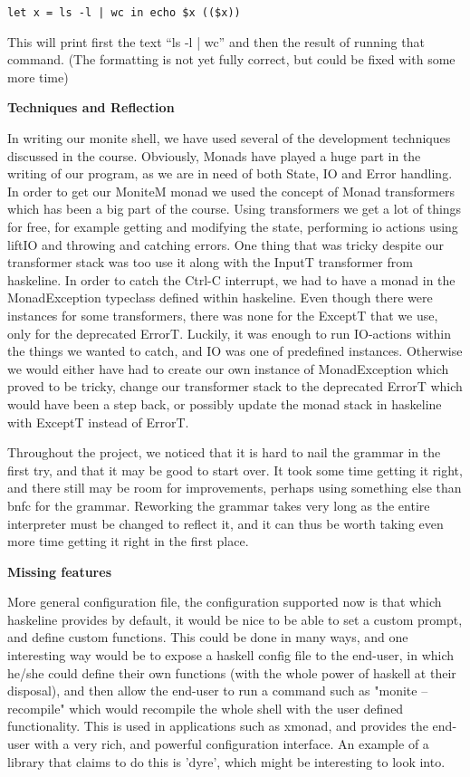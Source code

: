 \documentclass[11pt,a4paper]{article}
\begin{document}
\begin{verbatim}
let x = ls -l | wc in echo $x (($x))
\end{verbatim}

This will print first the text ``ls -l | wc'' and then the result of running
that command. (The formatting is not yet fully correct, but could be fixed with
some more time)

\textbf{Techniques and Reflection}

In writing our monite shell, we have used several of the development techniques
discussed in the course. Obviously, Monads have played a huge part in the
writing of our program, as we are in need of both State, IO and Error handling.
In order to get our MoniteM monad we used the concept of Monad transformers
which has been a big part of the course. Using transformers we get a lot of
things for free, for example getting and modifying the state, performing io
actions using liftIO and throwing and catching errors. One thing that was
tricky despite our transformer stack was too use it along with the InputT
transformer from haskeline. In order to catch the Ctrl-C interrupt, we had to
have a monad in the MonadException typeclass defined within haskeline. Even
though there were instances for some transformers, there was none for the
ExceptT that we use, only for the deprecated ErrorT. Luckily, it was enough to
run IO-actions within the things we wanted to catch, and IO was one of
predefined instances. Otherwise we would either have had to create our own
instance of MonadException which proved to be tricky, change our transformer
stack to the deprecated ErrorT which would have been a step back, or possibly
update the monad stack in haskeline with ExceptT instead of ErrorT.

Throughout the project, we noticed that it is hard to nail the grammar in the
first try, and that it may be good to start over. It took some time getting it
right, and there still may be room for improvements, perhaps using something
else than bnfc for the grammar. Reworking the grammar takes very long as the
entire interpreter must be changed to reflect it, and it can thus be worth
taking even more time getting it right in the first place.

\textbf{Missing features}

More general configuration file, the configuration supported now is that which
haskeline provides by default, it would be nice to be able to set a custom
prompt, and define custom functions. This could be done in many ways, and one
interesting way would be to expose a haskell config file to the end-user, in
which he/she could define their own functions (with the whole power of haskell
at their disposal), and then allow the end-user to run a command such as "monite
--recompile" which would recompile the whole shell with the user defined
functionality. This is used in applications such as xmonad, and provides the
end-user with a very rich, and powerful configuration interface. An example of a
library that claims to do this is 'dyre', which might be interesting to look
into.
\end{document}
